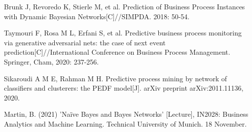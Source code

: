 \documentclass[runningheads]{llncs}
\begin{document}
\begin{thebibliography}{99}
	Brunk J, Revoredo K, Stierle M, et al. Prediction of Business Process Instances with Dynamic Bayesian Networks[C]//SIMPDA. 2018: 50-54.
	
	Taymouri F, Rosa M L, Erfani S, et al. Predictive business process monitoring via generative adversarial nets: the case of next event prediction[C]//International Conference on Business Process Management. Springer, Cham, 2020: 237-256.
	
	Sikaroudi A M E, Rahman M H. Predictive process mining by network of classifiers and clusterers: the PEDF model[J]. arXiv preprint arXiv:2011.11136, 2020.
	
	Martin, B. (2021) 'Naïve Bayes and Bayes Networks' [Lecture], IN2028: Business Analytics and Machine Learning. Technical University of Munich. 18 November.
		
	\end{thebibliography}

	
\end{document}
